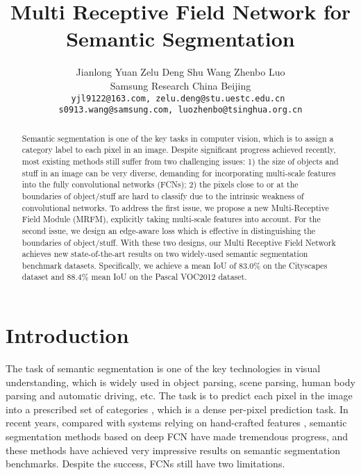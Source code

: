 \documentclass[final]{cvpr}
\begin{document}
\title{Multi Receptive Field Network for Semantic Segmentation}

\author{
Jianlong Yuan \quad Zelu Deng \quad Shu Wang \quad Zhenbo Luo\\
Samsung Research China Beijing\\
{\tt\small yjl9122@163.com, zelu.deng@stu.uestc.edu.cn } \\ 
{\tt\small s0913.wang@samsung.com, luozhenbo@tsinghua.org.cn}
}


\maketitle


\begin{abstract}
Semantic segmentation is one of the key tasks in computer vision, which is to assign a category label to each pixel in an image. Despite significant progress achieved recently, most existing methods still suffer from two challenging issues: 1) the size of objects and stuff in an image can be very diverse, demanding for incorporating multi-scale features into the fully convolutional networks (FCNs); 2) the pixels close to or at the boundaries of object/stuff are hard to classify due to the intrinsic weakness of convolutional networks. To address the first issue, we propose a new Multi-Receptive Field Module (MRFM), explicitly taking multi-scale features into account. For the second issue, we design an edge-aware loss which is effective in distinguishing the boundaries of object/stuff. With these two designs,  our Multi Receptive Field Network achieves new state-of-the-art results on two widely-used semantic segmentation benchmark datasets. Specifically, we achieve a mean IoU of 83.0\% on the Cityscapes dataset and 88.4\% mean IoU on the Pascal VOC2012 dataset.
\end{abstract}


\section{Introduction}

The task of semantic segmentation is one of the key technologies in visual understanding,
which is widely used in object parsing, scene parsing, human body parsing and automatic driving, etc. The task is to predict each pixel in the image into a prescribed set of categories \cite{caesar2016coco, cityscpaes, coco,everingham2012pascal,SBD}, which is a dense per-pixel prediction task. In recent years, compared with systems relying on hand-crafted features \cite{he2004multiscale,shotton2009textonboost,kohli2009robust,russell2009associative,gould2009decomposing,yao2012describing}, semantic segmentation methods based on deep FCN \cite{FCN1} have made tremendous progress, and these methods have achieved very impressive results on semantic segmentation benchmarks. Despite the success, FCNs still have two limitations.
\end{document}
